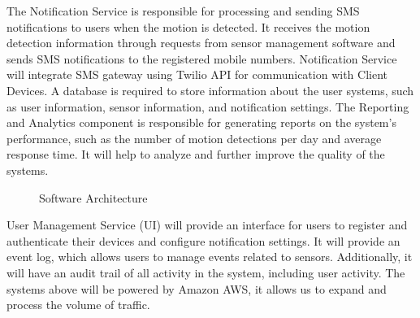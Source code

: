 \documentclass[conference]{IEEEtran}
\begin{document}
The Notification Service is responsible for processing and sending SMS notifications
to users when the motion is detected. It receives the motion detection information
through requests from sensor management software and sends SMS notifications to the
registered mobile numbers. Notification Service will integrate SMS gateway using
Twilio API for communication with Client Devices. A database is required to store
information about the user systems, such as user information, sensor information,
and notification settings. The Reporting and Analytics component is responsible
for generating reports on the system’s performance, such as the number of motion
detections per day and average response time. It will help to analyze and further
improve the quality of the systems.


\begin{figure}
      \centering
      \caption{Software Architecture}
      \label{fig:softwareArchitecture}
\end{figure}



User Management Service (UI) will provide an interface for users to register and
authenticate their devices and configure notification settings. It will provide an
event log, which allows users to manage events related to sensors. Additionally, it
will have an audit trail of all activity in the system, including user activity.
The systems above will be powered by Amazon AWS, it allows us to expand and process
the volume of traffic.
\end{document}
